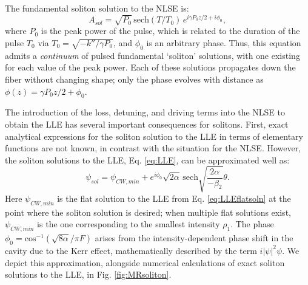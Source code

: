 The fundamental soliton solution to the NLSE is:
\begin{equation}
A_{sol}=\sqrt{P_0}\, \mathrm{sech}\left(T/T_0\right)\,e^{i\gamma P_0 z/2+i\phi_0},
\end{equation}
where $P_0$ is the peak power of the pulse, which is related to the duration of the pulse $T_0$ via $T_0=\sqrt{-k''/\gamma P_0}$, and $\phi_0$ is an arbitrary phase. Thus, this equation admits a \textit{continuum} of pulsed fundamental `soliton' solutions, with one existing for each value of the peak power. Each of these solutions propagates down the fiber without changing shape; only the phase evolves with distance as $\phi(z)=\gamma P_0 z/2+\phi_0$.


The introduction of the loss, detuning, and driving terms into the NLSE to obtain the LLE has several important consequences for solitons. First, exact analytical expressions for the soliton solution to the LLE in terms of elementary functions are not known, in contrast with the situation for the NLSE. However, the soliton solutions to the LLE, Eq. \ref{eq:LLE}, can be approximated well as:
\begin{equation}
\psi_{sol}=\psi_{CW,min}+e^{i\phi_0}\sqrt{2\alpha}\,\mathrm{sech}\sqrt{\frac{2\alpha}{-\beta_2}}\theta. \label{eq:LLEsoliton}
\end{equation}
Here $\psi_{CW,min}$ is the flat solution to the LLE from Eq. \ref{eq:LLEflatsoln} at the point where the soliton solution is desired; when multiple flat solutions exist, $\psi_{CW,min}$ is the one corresponding to the smallest intensity $\rho_1$. The phase $\phi_0=\mathrm{cos}^{-1}(\sqrt{8\alpha}/\pi F)$ arises from the intensity-dependent phase shift in the cavity due to the Kerr effect, mathematically described by the term $i|\psi|^2\psi$. We depict this approximation, alongside numerical calculations of exact soliton solutions to the LLE, in Fig. \ref{fig:MRsoliton}.


